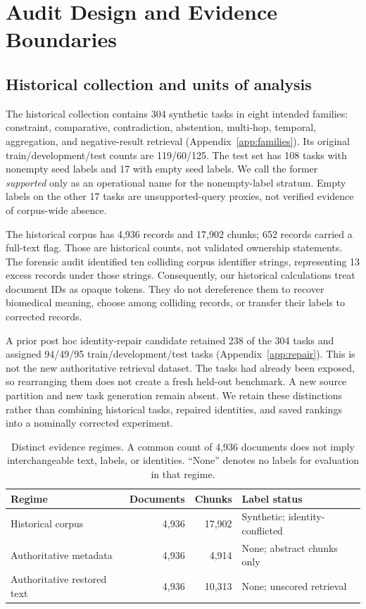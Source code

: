 \section{Audit Design and Evidence Boundaries}
\label{sec:design}
\subsection{Historical collection and units of analysis}
The historical collection contains 304 synthetic tasks in eight intended families: constraint, comparative, contradiction, abstention, multi-hop, temporal, aggregation, and negative-result retrieval (Appendix~\ref{app:families}). Its original train/development/test counts are 119/60/125. The test set has 108 tasks with nonempty seed labels and 17 with empty seed labels. We call the former \emph{supported} only as an operational name for the nonempty-label stratum. Empty labels on the other 17 tasks are unsupported-query proxies, not verified evidence of corpus-wide absence.

The historical corpus has 4,936 records and 17,902 chunks; 652 records carried a full-text flag. Those are historical counts, not validated ownership statements. The forensic audit identified ten colliding corpus identifier strings, representing 13 excess records under those strings. Consequently, our historical calculations treat document IDs as opaque tokens. They do not dereference them to recover biomedical meaning, choose among colliding records, or transfer their labels to corrected records.

A prior post hoc identity-repair candidate retained 238 of the 304 tasks and assigned 94/49/95 train/development/test tasks (Appendix~\ref{app:repair}). This is not the new authoritative retrieval dataset. The tasks had already been exposed, so rearranging them does not create a fresh held-out benchmark. A new source partition and new task generation remain absent. We retain these distinctions rather than combining historical tasks, repaired identities, and saved rankings into a nominally corrected experiment.

\begin{table}[t]
\centering
\caption{Distinct evidence regimes. A common count of 4,936 documents does not imply interchangeable text, labels, or identities. ``None'' denotes no labels for evaluation in that regime.}
\label{tab:regimes}
\begin{tabular}{@{}lrrl@{}}
\toprule
Regime & Documents & Chunks & Label status \\
\midrule
Historical corpus & 4,936 & 17,902 & Synthetic; identity-conflicted \\
Authoritative metadata & 4,936 & 4,914 & None; abstract chunks only \\
Authoritative restored text & 4,936 & 10,313 & None; unscored retrieval \\
\bottomrule
\end{tabular}
\end{table}

